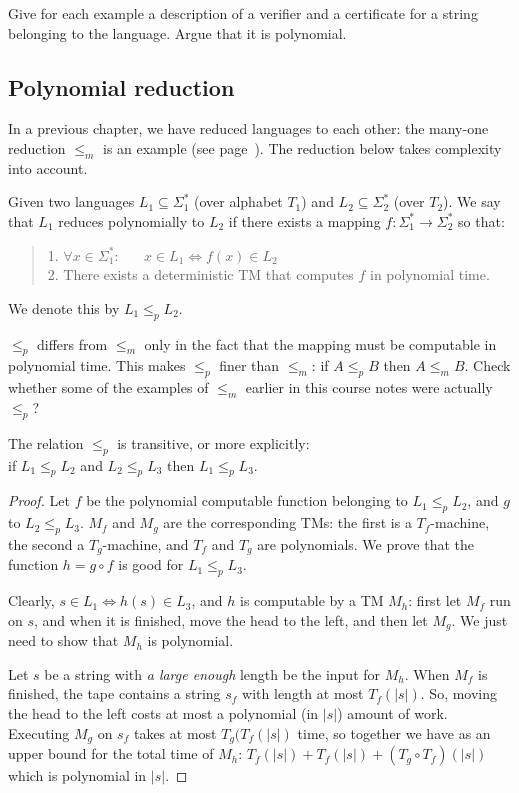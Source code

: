 \begin{exercise}
Give for each example a description of a verifier and a certificate
for a string belonging to the language. Argue that it is
polynomial.
\end{exercise}

\subsection{Polynomial reduction}

In a previous chapter, we have reduced languages to each other: the
many-one reduction $\leq_m$ {\mbox is an example} (see
page~\pageref{manyone}). The reduction below takes
complexity into account.

\begin{definition}
Given two languages $L_1\subseteq \Sigma_1^*$ (over alphabet $T_1$)
and $L_2\subseteq \Sigma_2^*$ (over $T_2$). We say that $L_1$
reduces polynomially to $L_2$ if there exists a mapping $f:\Sigma_1^*
\rightarrow \Sigma_2^*$ so that:
\begin{verse}
1. $\forall x\in \Sigma_1^*$: \ \ \ $x\in L_1\Leftrightarrow f(x)\in
L_2$\\[2mm] 2. There exists a deterministic TM that computes $f$ in
polynomial time.
\end{verse}
We denote this by $L_1 \leq_p  L_2$.
\end{definition}

$\leq_p$ differs from $\leq_m$ only in the fact that the mapping must
be computable in polynomial time. This makes $\leq_p$ finer than $\leq_m$:
if $A \leq_p B$ then $A \leq_m B$. Check whether some of the examples
of $\leq_m$ earlier in this course notes were actually $\leq_p$?

\begin{theorem} \label{transitief}
The relation $ \leq_p $ is transitive, or more explicitly:\\
if $L_1 \leq_p L_2$ and $L_2 \leq_p L_3$ then $L_1 \leq_p L_3$.
\end{theorem}
\begin{proof}
Let $f$ be the polynomial computable function belonging to $L_1
\leq_p L_2$, and $g$ to $L_2 \leq_p L_3$. $M_f$ and $M_g$ are the
corresponding TMs: the first is a $T_f$-machine, the second a
$T_g$-machine, and $T_f$ and $T_g$ are polynomials. We prove that
%
the function $h = g\circ f$ is good for $L_1 \leq_p L_3$.

Clearly, $s \in L_1 \Leftrightarrow h(s) \in L_3$, and $h$ is
computable by a TM $M_h$: first let $M_f$ run on $s$, and when it is
finished, move the head to the left, and then let $M_g$. We just need
to show that $M_h$ is polynomial.

Let $s$ be a string with {\em a large enough} length be the input for
$M_h$. When $M_f$ is finished, the tape contains a string $s_f$ with
length at most $T_f(|s|)$. So, moving the head to the left costs at
most a polynomial (in $|s|$) amount of work. Executing $M_g$ on $s_f$
takes at most $T_g(T_f(|s|)$ time, so together we have as an upper
bound for the total time of $M_h$:
%
$T_f(|s|) + T_f(|s|) + (T_g \circ T_f)(|s|)$ which is polynomial in
$|s|$.
\end{proof}


